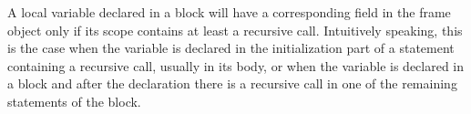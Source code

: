 A local variable declared in a block will have a corresponding field in the frame object only if its scope contains at
least a recursive call. Intuitively speaking, this is the case when the variable is declared in the initialization part
of a  statement containing a recursive call, usually in its body, or when the variable is declared in a block
and after the declaration there is a recursive call in one of the remaining statements of the block.
